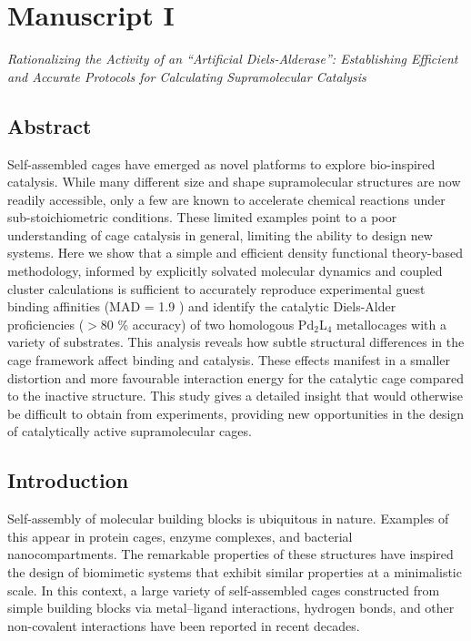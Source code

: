 \documentclass[../../main.tex]{subfiles}
\begin{document}
\setcounter{footnote}{0} 


\section{Manuscript I}
\emph{Rationalizing the Activity of an “Artificial Diels-Alderase”: Establishing Efficient and Accurate Protocols for Calculating Supramolecular Catalysis}


\subsection{Abstract}

Self-assembled cages have emerged as novel platforms to explore bio-inspired catalysis. While many different size and shape supramolecular structures are now readily accessible, only a few are known to accelerate chemical reactions under sub-stoichiometric conditions. These limited examples point to a poor understanding of cage catalysis in general, limiting the ability to design new systems. Here we show that a simple and efficient density functional theory-based methodology, informed by explicitly solvated molecular dynamics and coupled cluster calculations is sufficient to accurately reproduce experimental guest binding affinities (MAD = 1.9 \kcal) and identify the catalytic Diels-Alder proficiencies ($>$80 \% accuracy) of two homologous Pd$_2$L$_4$ metallocages with a variety of substrates. This analysis reveals how subtle structural differences in the cage framework affect binding and catalysis. These effects manifest in a smaller distortion and more favourable interaction energy for the catalytic cage compared to the inactive structure. This study gives a detailed insight that would otherwise be difficult to obtain from experiments, providing new opportunities in the design of catalytically active supramolecular cages.


\subsection{Introduction}

Self-assembly of molecular building blocks is ubiquitous in nature. Examples of this appear in protein cages,\cite{Theil2011, Azuma2016} enzyme complexes,\cite{Schmitt2017} and bacterial nanocompartments.\cite{Rurup2014} The remarkable properties of these structures have inspired the design of biomimetic systems that exhibit similar properties at a minimalistic scale. In this context, a large variety of self-assembled cages constructed from simple building blocks via metal–ligand interactions,\cite{Wiester2011, Cook2013} hydrogen bonds,\cite{Pahima2019, Zhang2013, Ajami2013} and other non-covalent interactions\cite{Kaanumalle2005} have been reported in recent decades. 
\end{document}
